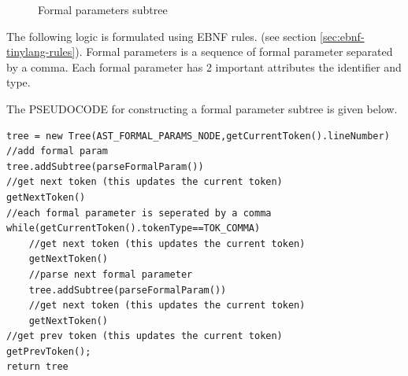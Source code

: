 \begin{figure}[H]
{
    }
    \caption{Formal parameters subtree}

    \label{fig:formal params subtree}
\end{figure}
The following logic is formulated using EBNF rules. (see section \ref{sec:ebnf-tinylang-rules}).
\vskip 0.1in    
Formal parameters is a sequence of formal parameter separated by a comma. Each formal parameter has 2 important attributes the identifier and type.
    
The PSEUDOCODE for constructing a formal parameter subtree is given below.
\begin{lstlisting}[caption=PSEUDOCODE for building a formal parameters subtree,label=listing:formal params subtree]
tree = new Tree(AST_FORMAL_PARAMS_NODE,getCurrentToken().lineNumber)
//add formal param
tree.addSubtree(parseFormalParam())
//get next token (this updates the current token)
getNextToken()
//each formal parameter is seperated by a comma
while(getCurrentToken().tokenType==TOK_COMMA)
    //get next token (this updates the current token)
    getNextToken() 
    //parse next formal parameter
    tree.addSubtree(parseFormalParam())
    //get next token (this updates the current token)
    getNextToken() 
//get prev token (this updates the current token)
getPrevToken();
return tree
\end{lstlisting}


